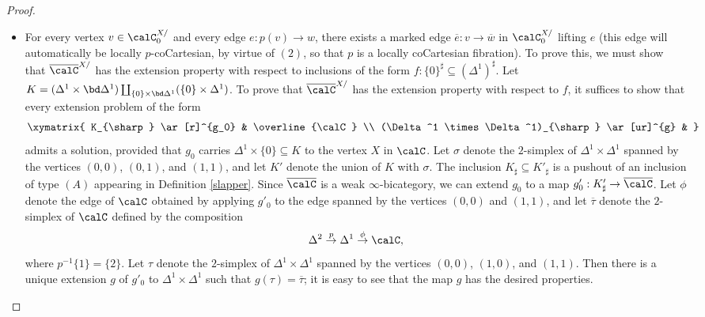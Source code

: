 \begin{proof}
\begin{itemize}
\item[$(3)$] For every vertex $v \in \calC^{X/}_0$ and every edge $e: p(v) \rightarrow w$, there
exists a marked edge $\overline{e}: v \rightarrow \overline{w}$ in $\calC^{X/}_0$ lifting $e$
(this edge will automatically be locally $p$-coCartesian, by virtue of $(2)$, so that $p$ is a locally
coCartesian fibration). To prove this, we must show that $\overline{\calC}^{X/}$ has the
extension property with respect to inclusions of the form
$f: \{0\}^{\sharp} \subseteq (\Delta^1)^{\sharp}$. Let
$K = (\Delta^1 \times \bd \Delta^1) \coprod_{ \{0\} \times \bd \Delta^1 } ( \{0\} \times \Delta^1)$.
To prove that $\overline{\calC}^{X/}$ has the extension property with respect to $f$, it suffices to show that every extension problem of the form
$$ \xymatrix{ K_{\sharp} \ar[r]^{g_0} & \overline{\calC} \\
(\Delta^1 \times \Delta^1)_{\sharp} \ar[ur]^{g} & }$$
admits a solution, provided that $g_0$ carries $\Delta^1 \times \{0\} \subseteq K$ to the vertex
$X$ in $\calC$. Let $\sigma$ denote the $2$-simplex of $\Delta^1 \times \Delta^1$ spanned by
the vertices $(0,0)$, $(0,1)$, and $(1,1)$, and let $K'$ denote the union of $K$ with $\sigma$.
The inclusion $K_{\sharp} \subseteq K'_{\sharp}$ is a pushout of an inclusion of type
$(A)$ appearing in Definition \ref{slapper}. Since $\overline{\calC}$ is a weak $\infty$-bicategory, we can extend $g_0$ to a map $g'_0: K'_{\sharp} \rightarrow \overline{\calC}$. Let $\phi$
denote the edge of $\calC$ obtained by applying $g'_0$ to the edge spanned by the vertices
$(0,0)$ and $(1,1)$, and let $\overline{\tau}$ denote the $2$-simplex of $\calC$ defined by the composition
$$ \Delta^2 \stackrel{p}{\rightarrow} \Delta^1 \stackrel{\phi}{\rightarrow} \calC,$$
where $p^{-1} \{1\} = \{2\}$. Let $\tau$ denote
the $2$-simplex of $\Delta^1 \times \Delta^1$ spanned by the vertices $(0,0)$, $(1,0)$, and $(1,1)$.
Then there is a unique extension $g$ of $g'_0$ to $\Delta^1 \times \Delta^1$ such that
$g(\tau) = \overline{\tau}$; it is easy to see that the map $g$ has the desired properties.


\end{itemize}
\end{proof}
